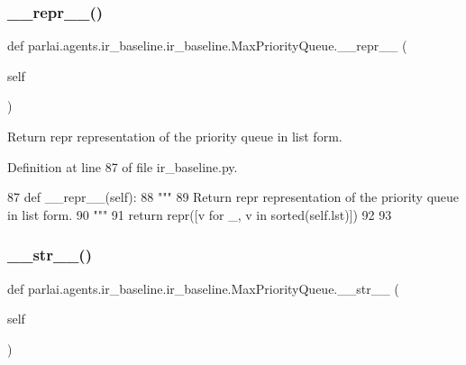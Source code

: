 \subsubsection{\texorpdfstring{\+\_\+\+\_\+repr\+\_\+\+\_\+()}{\_\_repr\_\_()}}
{\footnotesize\ttfamily def parlai.\+agents.\+ir\+\_\+baseline.\+ir\+\_\+baseline.\+Max\+Priority\+Queue.\+\_\+\+\_\+repr\+\_\+\+\_\+ (\begin{DoxyParamCaption}\item[{}]{self }\end{DoxyParamCaption})}

\begin{DoxyVerb}Return repr representation of the priority queue in list form.
\end{DoxyVerb}
 

Definition at line 87 of file ir\+\_\+baseline.\+py.


\begin{DoxyCode}
87     \textcolor{keyword}{def }\_\_repr\_\_(self):
88         \textcolor{stringliteral}{"""}
89 \textcolor{stringliteral}{        Return repr representation of the priority queue in list form.}
90 \textcolor{stringliteral}{        """}
91         \textcolor{keywordflow}{return} repr([v \textcolor{keywordflow}{for} \_, v \textcolor{keywordflow}{in} sorted(self.lst)])
92 
93 
\end{DoxyCode}
\mbox{\label{classparlai_1_1agents_1_1ir__baseline_1_1ir__baseline_1_1MaxPriorityQueue_a16e80c3c0f52236d14e5e1813a7c9c52}} 
\subsubsection{\texorpdfstring{\+\_\+\+\_\+str\+\_\+\+\_\+()}{\_\_str\_\_()}}
{\footnotesize\ttfamily def parlai.\+agents.\+ir\+\_\+baseline.\+ir\+\_\+baseline.\+Max\+Priority\+Queue.\+\_\+\+\_\+str\+\_\+\+\_\+ (\begin{DoxyParamCaption}\item[{}]{self }\end{DoxyParamCaption})}

